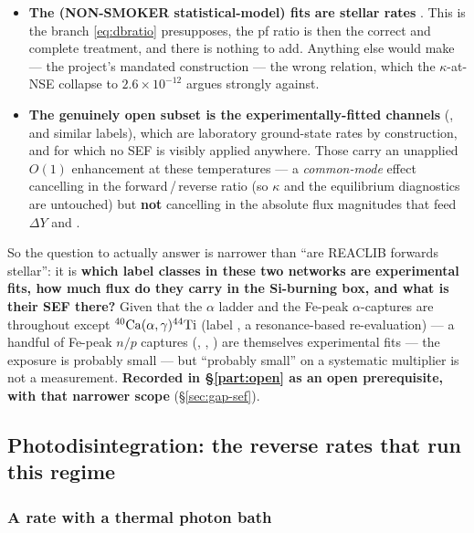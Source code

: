 \begin{itemize}
\item \textbf{The  (NON-SMOKER statistical-model) fits are stellar
      rates} \citep{cyburt2010,rauscher2000}. This is the branch
      \eqref{eq:dbratio} presupposes, the pf ratio is then the correct and
      complete treatment, and there is nothing to add. Anything else would make
       --- the project's mandated construction
      --- the wrong relation, which the $\kappa$-at-NSE collapse to
      $2.6\times10^{-12}$ argues strongly against.

\item \textbf{The genuinely open subset is the experimentally-fitted channels}
      (,  and similar labels), which are laboratory
      ground-state rates by construction, and for which no SEF is visibly
      applied anywhere. Those carry an unapplied $O(1)$ enhancement at these
      temperatures --- a \emph{common-mode} effect cancelling in the
      forward\,/\,reverse ratio (so $\kappa$ and the equilibrium diagnostics are
      untouched) but \textbf{not} cancelling in the absolute flux magnitudes
      that feed $\Delta Y$ and \enuc.
\end{itemize}

So the question to actually answer is narrower than ``are REACLIB forwards
stellar'': it is \textbf{which label classes in these two networks are
experimental fits, how much flux do they carry in the Si-burning box, and what
is their SEF there?} Given that the $\alpha$ ladder and the Fe-peak
$\alpha$-captures are  throughout except
$\nuc{Ca}{40}(\alpha,\gamma)\nuc{Ti}{44}$ (label , a resonance-based
re-evaluation) --- a handful of Fe-peak $n/p$ captures (,
, ) are themselves experimental fits --- the exposure is
probably small --- but ``probably small'' on a systematic multiplier is not a
measurement. \textbf{Recorded in \S\ref{part:open} as an open prerequisite, with
that narrower scope} (\S\ref{sec:gap-sef}).

\subsection{Photodisintegration: the reverse rates that run this regime}
\label{sec:photodis}

\subsubsection{A rate with a thermal photon bath}
\label{sec:photonbath}

